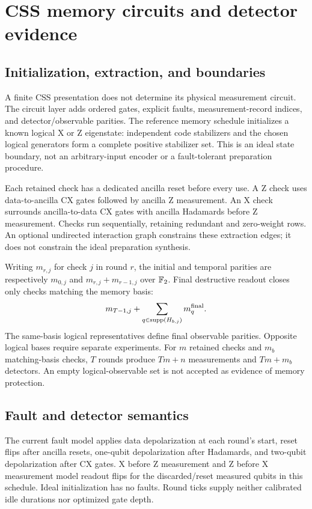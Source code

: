 \section{CSS memory circuits and detector evidence}

\subsection{Initialization, extraction, and boundaries}
A finite CSS presentation does not determine its physical measurement circuit.
The circuit layer adds ordered gates, explicit faults, measurement-record
indices, and detector/observable parities. The reference memory schedule
initializes a known logical X or Z eigenstate: independent code stabilizers
and the chosen logical generators form a complete positive stabilizer set.
This is an ideal state boundary, not an arbitrary-input encoder or a
fault-tolerant preparation procedure.

Each retained check has a dedicated ancilla reset before every use. A Z
check uses data-to-ancilla CX gates followed by ancilla Z measurement.
An X check surrounds ancilla-to-data CX gates with ancilla Hadamards before
Z measurement. Checks run sequentially, retaining redundant and zero-weight
rows. An optional undirected interaction graph constrains these extraction
edges; it does not constrain the ideal preparation synthesis.

Writing $m_{r,j}$ for check $j$ in round $r$, the initial and temporal
parities are respectively $m_{0,j}$ and $m_{r,j}+m_{r-1,j}$ over $\mathbb{F}_2$.
Final destructive readout closes only checks matching the memory basis:
\begin{equation}
 m_{T-1,j}+\sum_{q\in\operatorname{supp}(H_{b,j})}m_q^{\rm final}.
\end{equation}
The same-basis logical representatives define final observable parities.
Opposite logical bases require separate experiments. For $m$ retained
checks and $m_b$ matching-basis checks, $T$ rounds produce $Tm+n$
measurements and $Tm+m_b$ detectors. An empty logical-observable set is
not accepted as evidence of memory protection.

\subsection{Fault and detector semantics}
The current fault model applies data depolarization at each round's start,
reset flips after ancilla resets, one-qubit depolarization after Hadamards,
and two-qubit depolarization after CX gates. X before Z measurement and Z
before X measurement model readout flips for the discarded/reset measured
qubits in this schedule. Ideal initialization has no faults. Round ticks
supply neither calibrated idle durations nor optimized gate depth.

